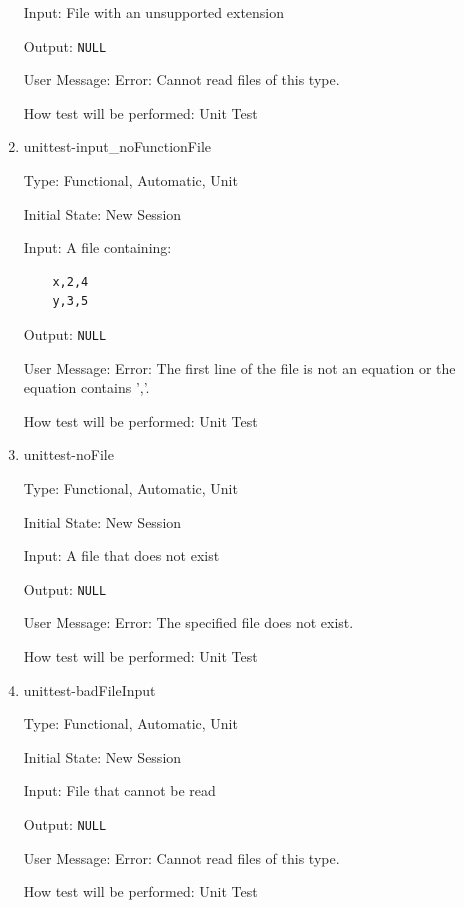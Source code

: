 \documentclass[12pt, titlepage]{article}
\begin{document}
\begin{enumerate}
	Input: File with an unsupported extension
	
	Output: \texttt{NULL}
	
	User Message: Error: Cannot read files of this type.
	
	How test will be performed: Unit Test\\
	
	\item{unittest-input\_noFunctionFile}
	
	Type: Functional, Automatic, Unit
	
	Initial State: New Session
	
	Input: A file containing:
	\begin{lstlisting}
	x,2,4
	y,3,5
	\end{lstlisting}
	
	Output: \texttt{NULL}
	
	User Message: Error: The first line of the file is not an equation or the 
	equation contains ','.
	
	How test will be performed: Unit Test\\
	
	\item{unittest-noFile}
	
	Type: Functional, Automatic, Unit
	
	Initial State: New Session
	
	Input: A file that does not exist
	
	Output: \texttt{NULL}
	
	User Message: Error: The specified file does not exist.
	
	How test will be performed: Unit Test\\
	
	\item{unittest-badFileInput}
	
	Type: Functional, Automatic, Unit
	
	Initial State: New Session
	
	Input: File that cannot be read
	
	Output: \texttt{NULL}
	
	User Message: Error: Cannot read files of this type.
	
	How test will be performed: Unit Test\\
\end{enumerate}
\end{document}
